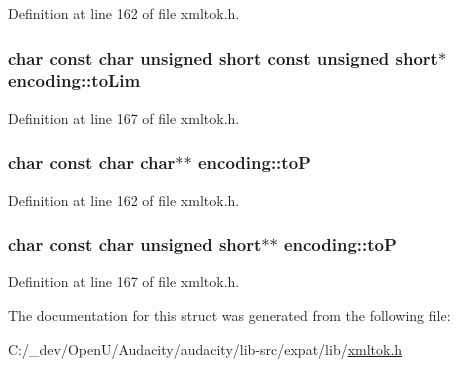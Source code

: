 Definition at line 162 of file xmltok.\+h.

\subsubsection[{\texorpdfstring{to\+Lim}{toLim}}]{ char {\bf const} char unsigned short {\bf const} unsigned short$\ast$ encoding\+::to\+Lim}\hypertarget{structencoding_a9f2d8e508359a95de3a19e34da249fd8}{}\label{structencoding_a9f2d8e508359a95de3a19e34da249fd8}


Definition at line 167 of file xmltok.\+h.

\subsubsection[{\texorpdfstring{toP}{toP}}]{ char {\bf const} char char$\ast$$\ast$ encoding\+::toP}\hypertarget{structencoding_ab10b959825711c5280c0f9cc2a491c5d}{}\label{structencoding_ab10b959825711c5280c0f9cc2a491c5d}


Definition at line 162 of file xmltok.\+h.

\subsubsection[{\texorpdfstring{toP}{toP}}]{ char {\bf const} char unsigned short$\ast$$\ast$ encoding\+::toP}\hypertarget{structencoding_af00d6198ca0eb6034520f814d6972dfd}{}\label{structencoding_af00d6198ca0eb6034520f814d6972dfd}


Definition at line 167 of file xmltok.\+h.



The documentation for this struct was generated from the following file\+:\begin{DoxyCompactItemize}
\item 
C\+:/\+\_\+dev/\+Open\+U/\+Audacity/audacity/lib-\/src/expat/lib/\hyperlink{xmltok_8h}{xmltok.\+h}\end{DoxyCompactItemize}
